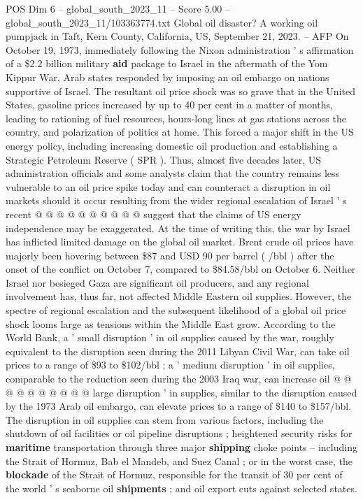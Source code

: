\begin{textsample}{POS Dim 6 – global\_south\_2023\_11 – Score 5.00 – global\_south\_2023\_11/103363774.txt}  \label{ex:f6_pos_256}
Global oil disaster?
A working oil pumpjack in Taft, Kern County, California, US, September 21, 2023. -- AFP On October 19, 1973, immediately following the Nixon administration ' s affirmation of a \$2.2 billion military \textbf{aid} package to Israel in the aftermath of the Yom Kippur War, Arab states responded by imposing an oil embargo on nations supportive of Israel.
The resultant oil price shock was so grave that in the United States, gasoline prices increased by up to 40 per cent in a matter of months, leading to rationing of fuel resources, hours-long lines at gas stations across the country, and polarization of politics at home.
This forced a major shift in the US energy policy, including increasing domestic oil production and establishing a Strategic Petroleum Reserve ( SPR ).
Thus, almost five decades later, US administration officials and some analysts claim that the country remains less vulnerable to an oil price spike today and can counteract a disruption in oil markets should it occur resulting from the wider regional escalation of Israel ' s recent @ @ @ @ @ @ @ @ @ @ suggest that the claims of US energy independence may be exaggerated.
At the time of writing this, the war by Israel has inflicted limited damage on the global oil market.
Brent crude oil prices have majorly been hovering between \$87 and USD 90 per barrel ( /bbl ) after the onset of the conflict on October 7, compared to \$84.58/bbl on October 6.
Neither Israel nor besieged Gaza are significant oil producers, and any regional involvement has, thus far, not affected Middle Eastern oil supplies.
However, the spectre of regional escalation and the subsequent likelihood of a global oil price shock looms large as tensions within the Middle East grow.
According to the World Bank, a ' small disruption ' in oil supplies caused by the war, roughly equivalent to the disruption seen during the 2011 Libyan Civil War, can take oil prices to a range of \$93 to \$102/bbl ; a ' medium disruption ' in oil supplies, comparable to the reduction seen during the 2003 Iraq war, can increase oil @ @ @ @ @ @ @ @ @ @ large disruption ' in supplies, similar to the disruption caused by the 1973 Arab oil embargo, can elevate prices to a range of \$140 to \$157/bbl.
The disruption in oil supplies can stem from various factors, including the shutdown of oil facilities or oil pipeline disruptions ; heightened security risks for \textbf{maritime} transportation through three major \textbf{shipping} choke points -- including the Strait of Hormuz, Bab el Mandeb, and Suez Canal ; or in the worst case, the \textbf{blockade} of the Strait of Hormuz, responsible for the transit of 30 per cent of the world ' s seaborne oil \textbf{shipments} ; and oil export cuts against selected states.

\end{textsample}
